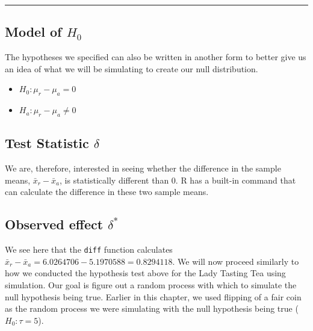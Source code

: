\documentclass[]{tufte-book}
\newenvironment{Shaded}{\begin{snugshade}}{\end{snugshade}}
\newcommand{\KeywordTok}[1]{\textcolor[rgb]{0.13,0.29,0.53}{\textbf{{#1}}}}
\newcommand{\DataTypeTok}[1]{\textcolor[rgb]{0.13,0.29,0.53}{{#1}}}
\newcommand{\StringTok}[1]{\textcolor[rgb]{0.31,0.60,0.02}{{#1}}}
\newcommand{\NormalTok}[1]{{#1}}
\let\oldrule=\rule
\renewcommand{\rule}[1]{\oldrule{\linewidth}}
\providecommand{\tightlist}{%
  \setlength{\itemsep}{0pt}\setlength{\parskip}{0pt}}
\begin{document}
\begin{center}\rule{0.5\linewidth}{\linethickness}\end{center}

\subsection{\texorpdfstring{Model of
\(H_0\)}{Model of H\_0}}\label{model-of-h_0-1}

The hypotheses we specified can also be written in another form to
better give us an idea of what we will be simulating to create our null
distribution.

\begin{itemize}
\tightlist
\item
  \(H_0: \mu_r - \mu_a = 0\)
\item
  \(H_a: \mu_r - \mu_a \ne 0\)
\end{itemize}

\subsection{\texorpdfstring{Test Statistic
\(\delta\)}{Test Statistic \textbackslash{}delta}}\label{test-statistic-delta-1}

We are, therefore, interested in seeing whether the difference in the
sample means, \(\bar{x}_r - \bar{x}_a\), is statistically different than
0. R has a built-in command that can calculate the difference in these
two sample means.

\subsection{\texorpdfstring{Observed effect
\(\delta^*\)}{Observed effect \textbackslash{}delta\^{}*}}\label{observed-effect-delta-1}

\begin{Shaded}
\end{Shaded}

We see here that the \texttt{diff} function calculates
\(\bar{x}_r - \bar{x}_a = 6.0264706 - 5.1970588 = 0.8294118\). We will
now proceed similarly to how we conducted the hypothesis test above for
the Lady Tasting Tea using simulation. Our goal is figure out a random
process with which to simulate the null hypothesis being true. Earlier
in this chapter, we used flipping of a fair coin as the random process
we were simulating with the null hypothesis being true
(\(H_0: \tau = 5\)).
\end{document}
